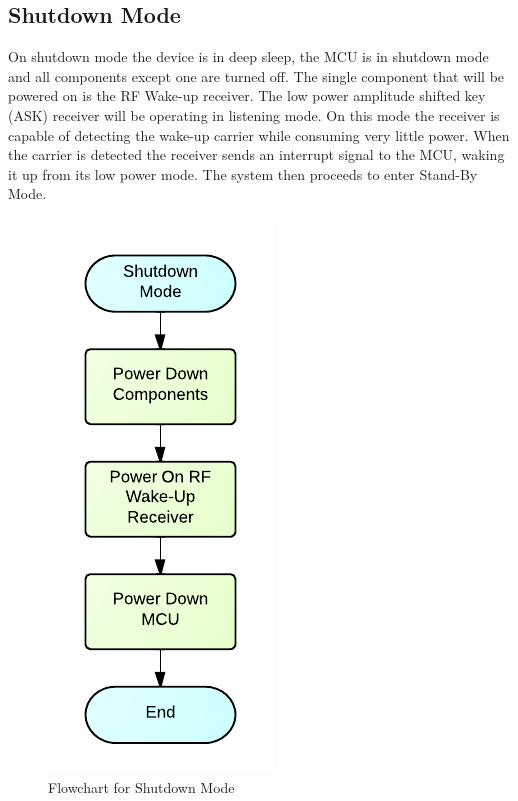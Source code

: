 \subsection{Shutdown Mode}

On shutdown mode the device is in deep sleep, the MCU is in shutdown mode and all components except one are turned off. The single component that will be powered on is the RF Wake-up receiver. The low power amplitude shifted key (ASK) receiver will be operating in listening mode. On this mode the receiver is capable of detecting the wake-up carrier while consuming very little power. When the carrier is detected the receiver sends an interrupt signal to the MCU, waking it up from its low power mode.  The system then proceeds to enter Stand-By Mode.

\begin{figure}[H]
	\centering
	\includegraphics[scale=1.0]{img/ShutdownMode}
	\caption{Flowchart for Shutdown Mode \label{fig:shutdownMode}}
\end{figure}

